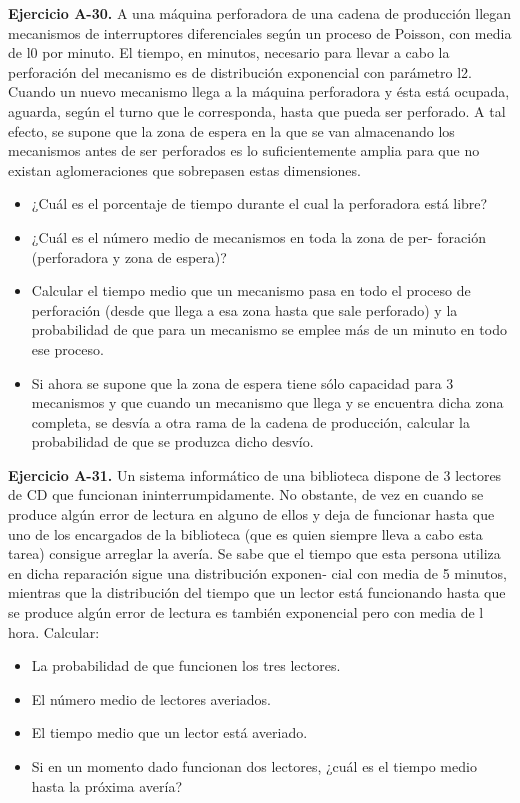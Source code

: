 \documentclass[
]{book}
\providecommand{\tightlist}{%
  \setlength{\itemsep}{0pt}\setlength{\parskip}{0pt}}
\theoremstyle{definition}
\theoremstyle{definition}
\theoremstyle{definition}
\theoremstyle{definition}
\theoremstyle{remark}
\begin{document}
\textbf{Ejercicio A-30.} A una máquina perforadora de una cadena de producción llegan mecanismos de interruptores diferenciales según un proceso de Poisson, con media de l0 por minuto. El tiempo, en minutos, necesario para llevar a cabo la perforación del mecanismo es de distribución exponencial con parámetro l2. Cuando un nuevo mecanismo llega a la máquina perforadora y ésta está ocupada, aguarda, según el turno que le corresponda, hasta que pueda ser perforado. A tal efecto, se supone que la zona de espera en la que se van almacenando los mecanismos antes de ser perforados es lo suficientemente amplia para que no existan aglomeraciones que sobrepasen estas dimensiones.

\begin{itemize}
\tightlist
\item
  ¿Cuál es el porcentaje de tiempo durante el cual la perforadora está libre?
\item
  ¿Cuál es el número medio de mecanismos en toda la zona de per- foración (perforadora y zona de espera)?
\item
  Calcular el tiempo medio que un mecanismo pasa en todo el proceso de perforación (desde que llega a esa zona hasta que sale perforado) y la probabilidad de que para un mecanismo se emplee más de un minuto en todo ese proceso.
\item
  Si ahora se supone que la zona de espera tiene sólo capacidad para 3 mecanismos y que cuando un mecanismo que llega y se encuentra dicha zona completa, se desvía a otra rama de la cadena de producción, calcular la probabilidad de que se produzca dicho desvío.
\end{itemize}

\textbf{Ejercicio A-31.} Un sistema informático de una biblioteca dispone de 3 lectores de CD que funcionan ininterrumpidamente. No obstante, de vez en cuando se produce algún error de lectura en alguno de ellos y deja de funcionar hasta que uno de los encargados de la biblioteca (que es quien siempre lleva a cabo esta tarea) consigue arreglar la avería. Se sabe que el tiempo que esta persona utiliza en dicha reparación sigue una distribución exponen- cial con media de 5 minutos, mientras que la distribución del tiempo que un lector está funcionando hasta que se produce algún error de lectura es también exponencial pero con media de l hora. Calcular:

\begin{itemize}
\tightlist
\item
  La probabilidad de que funcionen los tres lectores.
\item
  El número medio de lectores averiados.
\item
  El tiempo medio que un lector está averiado.
\item
  Si en un momento dado funcionan dos lectores, ¿cuál es el tiempo medio hasta la próxima avería?
\end{itemize}
\end{document}
